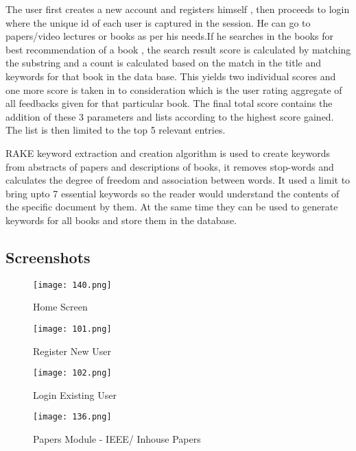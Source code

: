 \documentclass[a4paper,12pt]{report}
\begin{document}
\par The user first creates a new account and registers himself , then proceeds to login where the unique id of each user is captured in the session. He can go to papers/video lectures or books as per his needs.If he searches in the books for best recommendation of a book , the search result score is calculated by matching the substring and a count is calculated based on the match in the title and keywords for that book in the data base. This yields two individual scores and one more score is taken in to consideration which is the user rating aggregate of all feedbacks given for that particular book. The final total score contains the addition of these 3 parameters and lists according to the highest score gained. The list is then limited to the top 5 relevant entries. \\

\par RAKE keyword extraction and creation algorithm is used to create keywords from abstracts of papers and descriptions of books, it removes stop-words and calculates the degree of freedom and association between words. It used a limit to bring upto 7 essential keywords so the reader would understand the contents of the specific document by them. At the same time they can be used to generate keywords for all books and store them in the database.\\

\pagebreak
\subsection{Screenshots}

\FloatBarrier
\begin{figure}[h!]
  \centering
  \texttt{[image: 140.png]}
  \caption{Home Screen}
\end{figure}

\FloatBarrier
\begin{figure}[h!]
  \centering
  \texttt{[image: 101.png]} %
  \caption{Register New User}
\end{figure}

\FloatBarrier
\begin{figure}[h!]
  \centering
  \texttt{[image: 102.png]}
  \caption{Login Existing User}
\end{figure}

\FloatBarrier
\begin{figure}[h!]
  \centering
  \texttt{[image: 136.png]}
  \caption{Papers Module - IEEE/ Inhouse Papers}
\end{figure}
\end{document}
